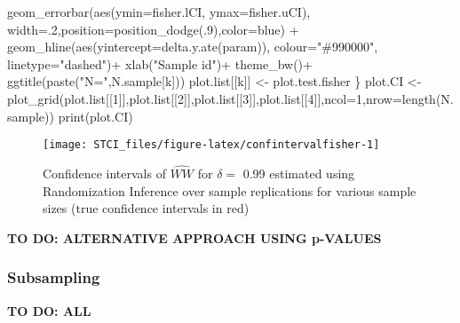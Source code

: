 \documentclass[
]{book}
\newenvironment{Shaded}{\begin{snugshade}}{\end{snugshade}}
\newcommand{\AttributeTok}[1]{\textcolor[rgb]{0.77,0.63,0.00}{#1}}
\newcommand{\DecValTok}[1]{\textcolor[rgb]{0.00,0.00,0.81}{#1}}
\newcommand{\FunctionTok}[1]{\textcolor[rgb]{0.00,0.00,0.00}{#1}}
\newcommand{\NormalTok}[1]{#1}
\newcommand{\OtherTok}[1]{\textcolor[rgb]{0.56,0.35,0.01}{#1}}
\newcommand{\SpecialCharTok}[1]{\textcolor[rgb]{0.00,0.00,0.00}{#1}}
\newcommand{\StringTok}[1]{\textcolor[rgb]{0.31,0.60,0.02}{#1}}
\theoremstyle{definition}
\theoremstyle{definition}
\theoremstyle{definition}
\theoremstyle{definition}
\theoremstyle{remark}
\begin{document}
\begin{Shaded}
\begin{Highlighting}[]
     \FunctionTok{geom\_errorbar}\NormalTok{(}\FunctionTok{aes}\NormalTok{(}\AttributeTok{ymin=}\NormalTok{fisher.lCI, }\AttributeTok{ymax=}\NormalTok{fisher.uCI), }\AttributeTok{width=}\NormalTok{.}\DecValTok{2}\NormalTok{,}\AttributeTok{position=}\FunctionTok{position\_dodge}\NormalTok{(.}\DecValTok{9}\NormalTok{),}\AttributeTok{color=}\StringTok{\textquotesingle{}blue\textquotesingle{}}\NormalTok{) }\SpecialCharTok{+}
     \FunctionTok{geom\_hline}\NormalTok{(}\FunctionTok{aes}\NormalTok{(}\AttributeTok{yintercept=}\FunctionTok{delta.y.ate}\NormalTok{(param)), }\AttributeTok{colour=}\StringTok{"\#990000"}\NormalTok{, }\AttributeTok{linetype=}\StringTok{"dashed"}\NormalTok{)}\SpecialCharTok{+}
     \FunctionTok{xlab}\NormalTok{(}\StringTok{"Sample id"}\NormalTok{)}\SpecialCharTok{+}
     \FunctionTok{theme\_bw}\NormalTok{()}\SpecialCharTok{+}
     \FunctionTok{ggtitle}\NormalTok{(}\FunctionTok{paste}\NormalTok{(}\StringTok{"N="}\NormalTok{,N.sample[k]))}
\NormalTok{ plot.list[[k]] }\OtherTok{\textless{}{-}}\NormalTok{ plot.test.fisher}
\NormalTok{\}}
\NormalTok{plot.CI }\OtherTok{\textless{}{-}} \FunctionTok{plot\_grid}\NormalTok{(plot.list[[}\DecValTok{1}\NormalTok{]],plot.list[[}\DecValTok{2}\NormalTok{]],plot.list[[}\DecValTok{3}\NormalTok{]],plot.list[[}\DecValTok{4}\NormalTok{]],}\AttributeTok{ncol=}\DecValTok{1}\NormalTok{,}\AttributeTok{nrow=}\FunctionTok{length}\NormalTok{(N.sample))}
\FunctionTok{print}\NormalTok{(plot.CI)}
\end{Highlighting}
\end{Shaded}

\begin{figure}[htbp]

{\centering \texttt{[image: STCI\_files/figure-latex/confintervalfisher-1]} 

}

\caption{Confidence intervals of $\hat{WW}$ for $\delta=$ 0.99 estimated using Randomization Inference over sample replications for various sample sizes (true confidence intervals in red)}\label{fig:confintervalfisher}
\end{figure}

\textbf{TO DO: ALTERNATIVE APPROACH USING p-VALUES}

\hypertarget{subsampling}{%
\subsubsection{Subsampling}\label{subsampling}}

\textbf{TO DO: ALL}
\end{document}
